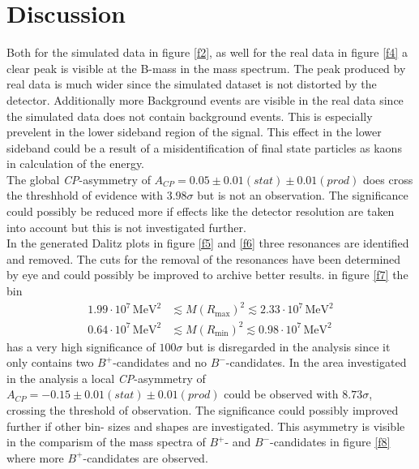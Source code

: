 \section{Discussion}
\label{sec:Diskussion}
Both for the simulated data in figure \ref{f2}, as well for the real data in figure \ref{f4} a clear peak is visible at the B-mass in the 
mass spectrum. The peak produced by real data is much wider since the simulated dataset is not distorted by the detector. Additionally 
more Background events are visible in the real data since the simulated data does not contain background events. This is especially 
prevelent in the lower sideband region of the signal. This effect in the lower sideband could be a result of a misidentification of final state 
particles as kaons in calculation of the energy. \\
The global \textit{CP}-asymmetry of $A_\textit{CP} = 0.05 \pm 0.01 (stat) \pm 0.01 (prod)$ does cross the threshhold of evidence with $3.98 \sigma$ 
but is not an observation. The significance 
could possibly be reduced more if effects like the detector resolution are taken into account but this is not investigated further. \\
In the generated Dalitz plots in figure \ref{f5} and \ref{f6} three resonances are identified and removed. The cuts for the 
removal of the resonances have been determined by eye and could possibly be improved to archive better results. 
in figure \ref{f7} the bin 
\begin{align*}
    1.99 \cdot 10^{7} \, \si{\mega\eV\squared} &\lesssim M(R_\text{max})^2 \lesssim 2.33 \cdot 10^{7} \, \si{\mega\eV\squared} \\
    0.64 \cdot 10^{7} \, \si{\mega\eV\squared} &\lesssim M(R_\text{min})^2 \lesssim 0.98 \cdot 10^{7} \, \si{\mega\eV\squared}
\end{align*}
has a very high significance of $100 \sigma$ but is disregarded in the analysis since it only contains two $B^+$-candidates and no $B^-$-candidates. 
In the area investigated in the analysis a local \textit{CP}-asymmetry of $A_\textit{CP} = -0.15  \pm 0.01  (stat)  \pm 0.01(prod)$ could be observed 
with $8.73 \sigma$, crossing the threshold of observation. The significance could possibly improved further if other bin- sizes and shapes are 
investigated. This asymmetry is visible in the comparism of the mass spectra of $B^+$- and $B^-$-candidates in figure \ref{f8} where more 
$B^+$-candidates are observed.
